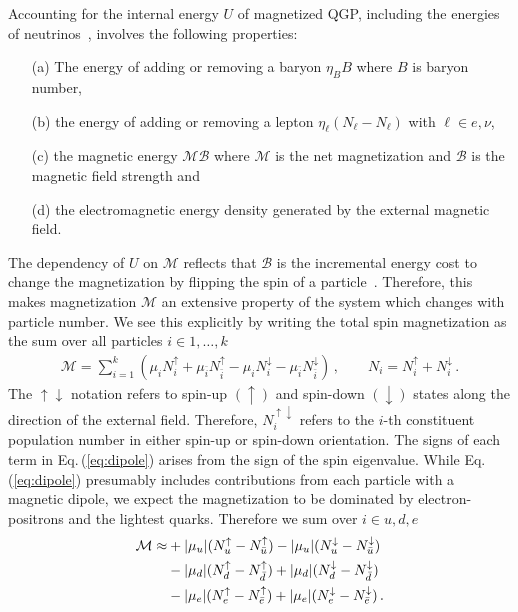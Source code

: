 \documentclass[epjST]{svjour}
\newcommand{\req}[1]{Eq.\,(\ref{#1})}
\begin{document}
Accounting for the internal energy $U$ of magnetized QGP, including the energies of neutrinos~\cite{Birrell:2014ona}, involves the following properties: 
\begin{itemize}
\item[(a)] The energy of adding or removing a baryon $\eta_{B}B$ where \(B\) is baryon number,
\item[(b)] the energy of adding or removing a lepton $\eta_{\ell}(N_{\ell}-N_{\ell})$ with $\ell\in {e,\nu}$, 
\item[(c)] the magnetic energy $\mathcal{M}\mathcal{B}$ where $\mathcal{M}$ is the net magnetization and $\mathcal{B}$ is the magnetic field strength and
\item[(d)] the electromagnetic energy density generated by the external magnetic field.
\end{itemize}

The dependency of $U$ on $\mathcal{M}$ reflects that $\mathcal{B}$ is the incremental energy cost to change the magnetization by flipping the spin of a particle~\cite{Bali:2014kia}. Therefore, this makes magnetization $\mathcal{M}$ an extensive property of the system which changes with particle number. We see this explicitly by writing the total spin magnetization as the sum over all particles $i\in{1,\ldots,k}$
\begin{align}
\label{eq:dipole}
\mathcal{M} = \sum_{i=1}^{k}(\mu_{i}N_{i}^{\uparrow} + \mu_{\bar{i}}N_{\bar{i}}^{\uparrow} - \mu_{i}N_{i}^{\downarrow} - \mu_{\bar{i}}N_{\bar{i}}^{\downarrow})\,,\qquad
N_{i} = N_{i}^{\uparrow} + N_{i}^{\downarrow}\,.
\end{align}
The $\uparrow\downarrow$ notation refers to spin-up $(\uparrow)$ and spin-down $(\downarrow)$ states along the direction of the external field. Therefore, $N_{i}^{\uparrow\downarrow}$ refers to the $i$-th constituent population number in either spin-up or spin-down orientation. The signs of each term in \req{eq:dipole} arises from the sign of the spin eigenvalue. While \req{eq:dipole} presumably includes contributions from each particle with a magnetic dipole, we expect the magnetization to be dominated by electron-positrons and the lightest quarks. Therefore we sum over $i\in{u,d,e}$
\begin{align}
\notag\mathcal{M} \approx &+|\mu_{u}|(N_{u}^{\uparrow}-N_{\bar{u}}^{\uparrow})-|\mu_{u}|(N_{u}^{\downarrow}-N_{\bar{u}}^{\downarrow})\\
\notag &-|\mu_{d}|(N_{d}^{\uparrow}-N_{\bar{d}}^{\uparrow})+|\mu_{d}|(N_{d}^{\downarrow}-N_{\bar{d}}^{\downarrow})\\
\label{eq:dipole2}
&-|\mu_{e}|(N_{e}^{\uparrow}-N_{\bar{e}}^{\uparrow})+|\mu_{e}|(N_{e}^{\downarrow}-N_{\bar{e}}^{\downarrow})\,.
\end{align}
\end{document}

